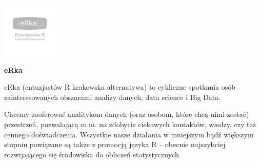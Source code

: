 \documentclass[\main/boa.tex]{subfiles}
\begin{document}
	
	\begin{minipage}[t]{0.915\textwidth}
		\center     
		\includegraphics[width=100px]{img/logos.bw/erka.png} 
	\end{minipage}
	
	\Large \textbf {eRka}
	
	
	\vskip 0.3cm
	\normalsize 
	
	
	eRka (entuzjastów R krakowska alternatywa) to cykliczne spotkania osób zainteresowanych obszarami analizy danych, data science i Big Data.
	
	Chcemy zaoferować analitykom danych (oraz osobom, które chcą nimi zostać) przestrzeń, pozwalającą m.in. na zdobycie ciekawych kontaktów, wiedzy, czy też cennego doświadczenia. Wszystkie nasze działania w mniejszym bądź większym stopniu powiązane są także z promocją języka R – obecnie najszybciej rozwijającego się środowiska do obliczeń statystycznych.
	
\end{document}
